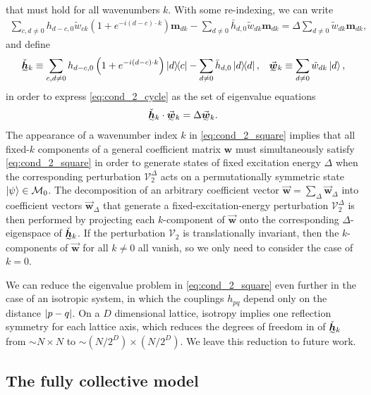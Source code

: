 \documentclass[nofootinbib,notitlepage,11pt]{revtex4-2}
\newcommand{\p}[1]{\left(#1\right)} %
\renewcommand{\c}{\cdot} %
\newcommand{\m}{\bm} %
\renewcommand{\v}{\vec} %
\newcommand{\1}{\mathds{1}}
\newcommand{\M}{\mathcal{M}}
\newcommand{\V}{\mathcal{V}}
\newcommand{\ut}{\undertilde}
\begin{document}
that must hold for all wavenumbers $k$.  With some re-indexing, we can
write
\begin{align}
  \sum_{c,d\ne0} h_{d-c,0} \tilde w_{ck}
  \p{1 + e^{-i\p{d-c}\c k}} \m m_{dk}
  - \sum_{d\ne0} \bar h_{d,0} \tilde w_{dk} \m m_{dk}
  = \Delta \sum_{d\ne0} \tilde w_{dk} \m m_{dk},
  \label{eq:cond_2_cycle}
\end{align}
and define
\begin{align}
  \ut{\check{\m h}}_k
  \equiv \sum_{c,d\ne0} h_{d-c,0} \p{1+e^{-i\p{d-c}\c k}} \op{d}{c}
  - \sum_{d\ne0} \bar h_{d,0} \op{d},
  &&
  \ut{\v{\m w}}_k \equiv \sum_{d\ne0} \tilde w_{dk} \ket{d},
  \label{eq:cycle_vecs}
\end{align}
in order to express \eqref{eq:cond_2_cycle} as the set of eigenvalue
equations
\begin{align}
  \ut{\check{\m h}}_k \c \ut{\v{\m w}}_k = \Delta \ut{\v{\m w}}_k.
  \label{eq:cond_2_square}
\end{align}
The appearance of a wavenumber index $k$ in \eqref{eq:cond_2_square}
implies that all fixed-$k$ components of a general coefficient matrix
$\m w$ must simultaneously satisfy \eqref{eq:cond_2_square} in order
to generate states of fixed excitation energy $\Delta$ when the
corresponding perturbation $\V_2^\Delta$ acts on a permutationally
symmetric state $\ket\psi\in\M_0$.  The decomposition of an arbitrary
coefficient vector $\v{\m w}=\sum_\Delta\v{\m w}_\Delta$ into
coefficient vectors $\v{\m w}_\Delta$ that generate a
fixed-excitation-energy perturbation $\V_2^\Delta$ is then performed
by projecting each $k$-component of $\v{\m w}$ onto the corresponding
$\Delta$-eigenspace of $\ut{\check{\m h}}_k$.  If the perturbation
$\V_2$ is translationally invariant, then the $k$-components of
$\v{\m w}$ for all $k\ne 0$ all vanish, so we only need to consider
the case of $k=0$.

We can reduce the eigenvalue problem in \eqref{eq:cond_2_square} even
further in the case of an isotropic system, in which the couplings
$h_{pq}$ depend only on the distance $\abs{p-q}$.  On a $D$
dimensional lattice, isotropy implies one reflection symmetry for each
lattice axis, which reduces the degrees of freedom in of
$\ut{\check{\m h}}_k$ from $\sim N\times N$ to
$\sim\p{N/2^D}\times\p{N/2^D}$.  We leave this reduction to future
work.

\subsection{The fully collective model}
\end{document}
